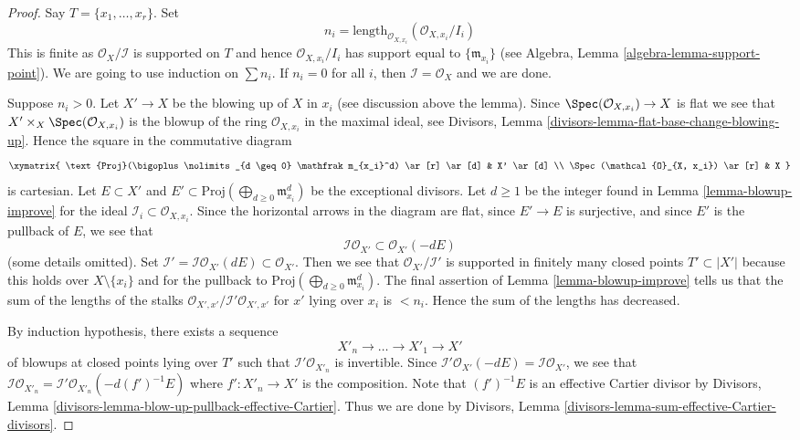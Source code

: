 \begin{proof}
Say $T = \{x_1, \ldots, x_r\}$. Set
$$
n_i = \text{length}_{\mathcal{O}_{X, x_i}}(\mathcal{O}_{X, x_i}/I_i)
$$
This is finite as $\mathcal{O}_X/\mathcal{I}$ is supported on $T$
and hence $\mathcal{O}_{X, x_i}/I_i$ has support equal to
$\{\mathfrak m_{x_i}\}$ (see Algebra, Lemma \ref{algebra-lemma-support-point}).
We are going to use induction on $\sum n_i$. If $n_i = 0$ for all
$i$, then $\mathcal{I} = \mathcal{O}_X$ and we are done.

\medskip\noindent
Suppose $n_i > 0$. Let $X' \to X$ be the blowing up of $X$ in $x_i$
(see discussion above the lemma).
Since $\Spec(\mathcal{O}_{X, x_i}) \to X$ is flat we see that
$X' \times_X \Spec(\mathcal{O}_{X, x_i})$ is the blowup of
the ring $\mathcal{O}_{X, x_i}$ in the maximal ideal, see
Divisors, Lemma
\ref{divisors-lemma-flat-base-change-blowing-up}.
Hence the square in the commutative diagram
$$
\xymatrix{
\text{Proj}(\bigoplus\nolimits_{d \geq 0} \mathfrak m_{x_i}^d) \ar[r] \ar[d] &
X' \ar[d] \\
\Spec(\mathcal{O}_{X, x_i}) \ar[r] & X
}
$$
is cartesian. Let $E \subset X'$ and
$E' \subset \text{Proj}(\bigoplus\nolimits_{d \geq 0} \mathfrak m_{x_i}^d)$
be the exceptional divisors. Let $d \geq 1$ be the integer found in
Lemma \ref{lemma-blowup-improve} for the ideal
$\mathcal{I}_i \subset \mathcal{O}_{X, x_i}$.
Since the horizontal arrows in the diagram are flat, since
$E' \to E$ is surjective, and since $E'$ is the pullback of $E$, we see that
$$
\mathcal{I}\mathcal{O}_{X'} \subset \mathcal{O}_{X'}(-dE)
$$
(some details omitted).
Set $\mathcal{I}' = \mathcal{I}\mathcal{O}_{X'}(dE) \subset \mathcal{O}_{X'}$.
Then we see that $\mathcal{O}_{X'}/\mathcal{I}'$ is supported in finitely
many closed points $T' \subset |X'|$ because this holds over
$X \setminus \{x_i\}$ and for the pullback to
$\text{Proj}(\bigoplus\nolimits_{d \geq 0} \mathfrak m_{x_i}^d)$.
The final assertion of Lemma \ref{lemma-blowup-improve}
tells us that the sum of the lengths of the stalks
$\mathcal{O}_{X', x'}/\mathcal{I}'\mathcal{O}_{X', x'}$
for $x'$ lying over $x_i$ is $< n_i$. Hence the sum of the lengths
has decreased.

\medskip\noindent
By induction hypothesis, there exists a sequence
$$
X'_n \to \ldots \to X'_1 \to X'
$$
of blowups at closed points lying over $T'$ such that
$\mathcal{I}'\mathcal{O}_{X'_n}$ is invertible. Since
$\mathcal{I}'\mathcal{O}_{X'}(-dE) = \mathcal{I}\mathcal{O}_{X'}$, we see
that $\mathcal{I}\mathcal{O}_{X'_n} =
\mathcal{I}'\mathcal{O}_{X'_n}(-d(f')^{-1}E)$
where $f' : X'_n \to X'$ is the composition.
Note that $(f')^{-1}E$ is an effective Cartier divisor by
Divisors, Lemma \ref{divisors-lemma-blow-up-pullback-effective-Cartier}.
Thus we are done by
Divisors, Lemma \ref{divisors-lemma-sum-effective-Cartier-divisors}.
\end{proof}

